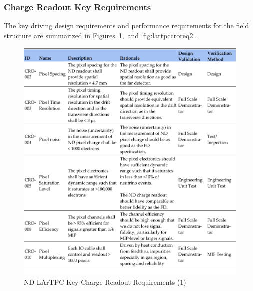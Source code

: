 \subsubsection{Charge Readout Key Requirements}
\label{sec:lartpc-cro-req}
The key driving design requirements and performance requirements for the field structure are summarized in Figures~\ref{fig:lartpccroreq1},~and \ref{fig:lartpccroreq2}. 

\begin{figure}
\centering 
\includegraphics[width=1\linewidth]{graphics/lartpc/0Req/NDCROreqs1.pdf}
\caption{\label{fig:lartpccroreq1} ND LArTPC Key Charge Readout Requirements (1)}
\end{figure}

